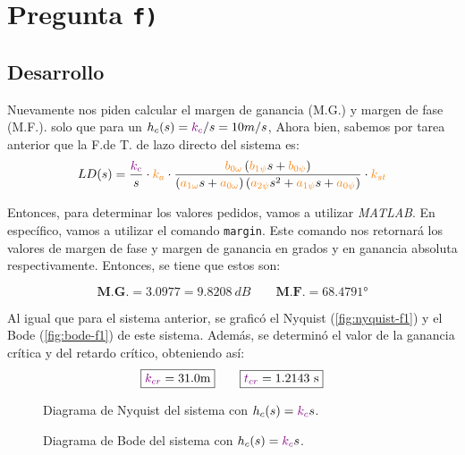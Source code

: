 \section{Pregunta \texttt{f)}}\label{pregunta-f}

\subsection{Desarrollo}

Nuevamente nos piden calcular el margen de ganancia (M.G.) y margen de fase
(M.F.). solo que para un \(h_c(s)= \mathbin{\color{violet}k_c}/s = 10m/s\), Ahora bien, sabemos 
por tarea anterior \cite{tarea-2-sdc} que la F.de T. de lazo directo del sistema es:
\begin{equation}
  LD(s) = \frac{\mora{k_c}}{s} \cdot \nara{k_a} \cdot \frac{\nara{b_{0\omega}} \left(\nara{b_{1\psi}}s + \nara{b_{0\psi}}\right)}
  {\left(\nara{a_{1\omega}}s + \nara{a_{0\omega}}\right)\left(\nara{a_{2\psi}}s^2 + \nara{a_{1\psi}}s + \nara{a_{0\psi}}\right)} \cdot \nara{k_{st}}
\end{equation}

Entonces, para determinar los valores pedidos, vamos a utilizar  \textit{MATLAB}.
En específico, vamos a utilizar el comando \texttt{margin}. Este comando nos retornará
los valores de margen de fase y margen de ganancia en grados y en ganancia absoluta
respectivamente. Entonces, se tiene que estos son:

\begin{equation}
  \boxed{\textbf{M.G.} = 3.0977 = 9.8208\ \unit{dB}} \qquad \boxed{\textbf{M.F.} = \ang{68.4791}}
\end{equation}

Al igual que para el sistema anterior, se graficó el Nyquist (\autoref{fig:nyquist-f1})
y el Bode (\autoref{fig:bode-f1}) de este sistema. Además, se determinó el valor de la
ganancia crítica y del retardo crítico, obteniendo así:
\begin{equation}
  \boxed{\mora{k_{cr}} = 31.0\unit{m}} \qquad \boxed{\mora{t_{cr}} = 1.2143\ \unit{s}}
\end{equation}

\begin{figure}[h]
  \centering
  
  \caption{Diagrama de Nyquist del sistema con $h_{c}(s) = \mathbin{\color{violet}k_{c}}\mathbin{s}$.}
  \label{fig:nyquist-f1}
\end{figure}

\begin{figure}[h]
  \centering
  
  \caption{Diagrama de Bode del sistema con $h_{c}(s) = \mathbin{\color{violet}k_{c}}\mathbin{s}$.}
  \label{fig:bode-f1}
\end{figure}

